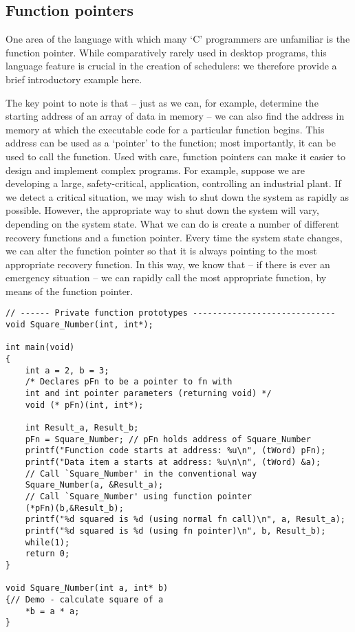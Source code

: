 \subsection{Function pointers}
One area of the language with which many `C' programmers are unfamiliar is the
function pointer. While comparatively rarely used in desktop programs, this language
feature is crucial in the creation of schedulers: we therefore provide a brief introductory example here.

The key point to note is that – just as we can, for example, determine the starting
address of an array of data in memory – we can also find the address in memory at
which the executable code for a particular function begins. This address can be used
as a ‘pointer’ to the function; most importantly, it can be used to call the function.
Used with care, function pointers can make it easier to design and implement complex programs. For example, suppose we are developing a large, safety-critical,
application, controlling an industrial plant. If we detect a critical situation, we may
wish to shut down the system as rapidly as possible. However, the appropriate way to
shut down the system will vary, depending on the system state. What we can do is
create a number of different recovery functions and a function pointer. Every time
the system state changes, we can alter the function pointer so that it is always pointing to the most appropriate recovery function. In this way, we know that – if there is
ever an emergency situation – we can rapidly call the most appropriate function, by
means of the function pointer.

\begin{lstlisting}[basicstyle=\small, caption=Example of how to use function pointers]
// ------ Private function prototypes -----------------------------
void Square_Number(int, int*);

int main(void)
{
    int a = 2, b = 3; 
    /* Declares pFn to be a pointer to fn with 
    int and int pointer parameters (returning void) */
    void (* pFn)(int, int*);
    
    int Result_a, Result_b;
    pFn = Square_Number; // pFn holds address of Square_Number
    printf("Function code starts at address: %u\n", (tWord) pFn);
    printf("Data item a starts at address: %u\n\n", (tWord) &a);
    // Call `Square_Number' in the conventional way
    Square_Number(a, &Result_a);
    // Call `Square_Number' using function pointer
    (*pFn)(b,&Result_b);
    printf("%d squared is %d (using normal fn call)\n", a, Result_a); 
    printf("%d squared is %d (using fn pointer)\n", b, Result_b); 
    while(1);
    return 0;
}

void Square_Number(int a, int* b)
{// Demo - calculate square of a
    *b = a * a;
}
\end{lstlisting}

